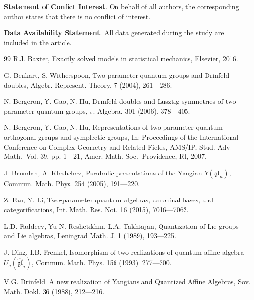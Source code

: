 \documentclass[10pt,a4paper]{amsart}
\numberwithin{equation}{section}
\begin{document}
\bigskip

{\bf Statement of Confict Interest}. On behalf of all authors, the corresponding author states that
there is no conflict of interest.

\bigskip

{\bf Data Availability Statement}. All data generated during the study are included in the article.




\begin{thebibliography}{99}
	R.J.  Baxter, Exactly solved models in statistical mechanics, Elsevier, 2016.   %
	
	
	G. Benkart, S. Witherspoon, Two-parameter quantum groups and Drinfeld doubles, Algebr.
	Represent. Theory. 7 (2004), 261---286.
	
	N. Bergeron, Y. Gao, N. Hu, Drinfeld doubles and Lusztig symmetries of two-parameter quantum groups, J. Algebra. 301 (2006), 378---405.
	
	N. Bergeron, Y. Gao, N. Hu, Representations of two-parameter quantum orthogonal groups and symplectic groups, In: Proceedings of the International Conference on Complex Geometry and Related Fields, AMS/IP, Stud. Adv. Math., Vol. 39, pp. 1---21, Amer. Math. Soc., Providence, RI, 2007.
	
	 J. Brundan, A. Kleshchev, Parabolic presentations of the Yangian $Y(\mathfrak{gl}_n)$, Commun. Math. Phys. 254 (2005), 191---220.
	
	 Z. Fan, Y. Li, Two-parameter quantum algebras, canonical bases, and categorifications, Int. Math. Res. Not. 16 (2015), 7016---7062.
	
	L.D. Faddeev, Yu N. Reshetikhin, L.A. Takhtajan, Quantization of Lie groups and Lie algebras, Leningrad Math. J. 1 (1989), 193---225.
	
	J. Ding, I.B. Frenkel, Isomorphism of two realizations of quantum affine algebra $U_q(\widehat{\mathfrak{g l}}_n)$, Commun. Math. Phys. 156 (1993), 277---300.
	
	V.G. Drinfeld, A new realization of Yangians and Quantized Affine Algebras, Sov. Math. Dokl. 36 (1988), 212---216.


\end{thebibliography}
\end{document}
